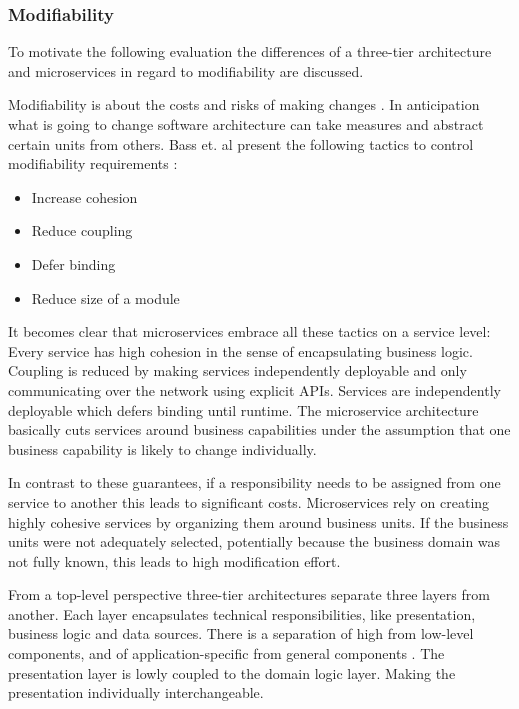 \subsubsection{Modifiability}
\label{quaMicro:modifiabilityDiscussion}
To motivate the following evaluation the differences of a three-tier architecture and microservices in regard to modifiability are discussed.

Modifiability is about the costs and risks of making changes \citep[p. 117f.]{Bass2012}.
In anticipation what is going to change software architecture can take measures and abstract certain units from others.
Bass et. al present the following tactics to control modifiability requirements \citep[p. 122]{Bass2012}: 
\begin{itemize}
\item Increase cohesion
\item Reduce coupling
\item Defer binding
\item Reduce size of a module
\end{itemize}

It becomes clear that microservices embrace all these tactics on a service level:
Every service has high cohesion in the sense of encapsulating business logic.
Coupling is reduced by making services independently deployable and only communicating over the network using explicit \ac{API}s.
Services are independently deployable which defers binding until runtime.
The microservice architecture basically cuts services around business capabilities under the assumption that one business capability is likely to change individually.

In contrast to these guarantees, if a responsibility needs to be assigned from one service to another this leads to significant costs.
Microservices rely on creating highly cohesive services by organizing them around business units.
If the business units were not adequately selected, potentially because the business domain was not fully known, this leads to high modification effort.

From a top-level perspective three-tier architectures separate three layers from another.
Each layer encapsulates technical responsibilities, like presentation, business logic and data sources.
There is a separation of high from low-level components, and of application-specific from general components \citep[p. 204 f.]{Larman2004}.
The presentation layer is lowly coupled to the domain logic layer.
Making the presentation individually interchangeable.

